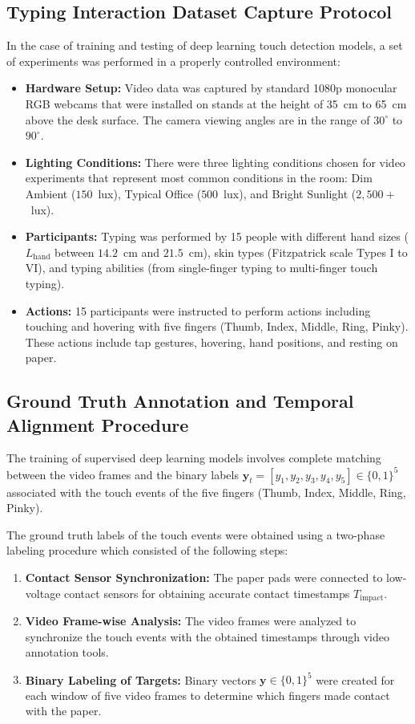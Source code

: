 \subsection{Typing Interaction Dataset Capture Protocol}
In the case of training and testing of deep learning touch detection models, a set of experiments was performed in a properly controlled environment:
\begin{itemize}
    \item \textbf{Hardware Setup:} Video data was captured by standard 1080p monocular RGB webcams that were installed on stands at the height of 35~cm to 65~cm above the desk surface. The camera viewing angles are in the range of $30^\circ$ to $90^\circ$.
    \item \textbf{Lighting Conditions:} There were three lighting conditions chosen for video experiments that represent most common conditions in the room: Dim Ambient ($150$~lux), Typical Office ($500$~lux), and Bright Sunlight ($2,500+$~lux).
    \item \textbf{Participants:} Typing was performed by 15 people with different hand sizes ($L_{\text{hand}}$ between $14.2$~cm and $21.5$~cm), skin types (Fitzpatrick scale Types I to VI), and typing abilities (from single-finger typing to multi-finger touch typing).
    \item \textbf{Actions:} 15 participants were instructed to perform actions including touching and hovering with five fingers (Thumb, Index, Middle, Ring, Pinky). These actions include tap gestures, hovering, hand positions, and resting on paper.
\end{itemize}

\subsection{Ground Truth Annotation and Temporal Alignment Procedure}
\label{subsec:meth_ground_truth_annotation}
The training of supervised deep learning models involves complete matching between the video frames and the binary labels $\mathbf{y}_t = [y_1, y_2, y_3, y_4, y_5] \in \{0, 1\}^5$ associated with the touch events of the five fingers (Thumb, Index, Middle, Ring, Pinky).

The ground truth labels of the touch events were obtained using a two-phase labeling procedure which consisted of the following steps:
\begin{enumerate}
    \item \textbf{Contact Sensor Synchronization:} The paper pads were connected to low-voltage contact sensors for obtaining accurate contact timestamps $T_{\text{impact}}$.
    \item \textbf{Video Frame-wise Analysis:} The video frames were analyzed to synchronize the touch events with the obtained timestamps through video annotation tools.
    \item \textbf{Binary Labeling of Targets:} Binary vectors $\mathbf{y} \in \{0, 1\}^5$ were created for each window of five video frames to determine which fingers made contact with the paper.
\end{enumerate}

